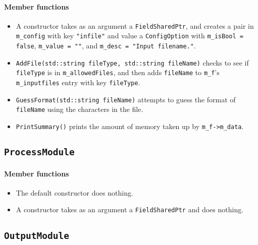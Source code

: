 \paragraph{Member functions}

\begin{itemize}

\item A constructor takes as an argument a \verb+FieldSharedPtr+, and creates a pair in \verb+m_config+ with key \verb+"infile"+ and value a \verb+ConfigOption+ with \verb+m_isBool = false+, \verb+m_value = ""+, and \verb+m_desc = "Input filename."+.

\item \verb+AddFile(std::string fileType, std::string fileName)+ checks to see if \verb+fileType+ is in \verb+m_allowedFiles+, and then adds \verb+fileName+ to \verb+m_f+'s \verb+m_inputfiles+ entry with key \verb+fileType+.

\item \verb+GuessFormat(std::string fileName)+ attempts to guess the format of \verb+fileName+ using the characters in the file.

\item \verb+PrintSummary()+ prints the amount of memory taken up by \verb+m_f->m_data+.

\end{itemize}


\subsection{\texttt{ProcessModule}}

\paragraph{Member functions}

\begin{itemize}

\item The default constructor does nothing.

\item A constructor takes as an argument a \verb+FieldSharedPtr+ and does nothing.

\end{itemize}

\subsection{\texttt{OutputModule}}

